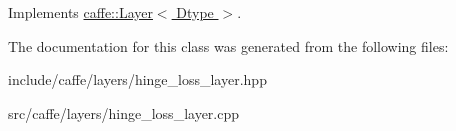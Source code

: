 Implements \hyperlink{classcaffe_1_1Layer_add965883f75bbf90c7a06f960cda7a1a}{caffe\+::\+Layer$<$ Dtype $>$}.



The documentation for this class was generated from the following files\+:\begin{DoxyCompactItemize}
\item 
include/caffe/layers/hinge\+\_\+loss\+\_\+layer.\+hpp\item 
src/caffe/layers/hinge\+\_\+loss\+\_\+layer.\+cpp\end{DoxyCompactItemize}
